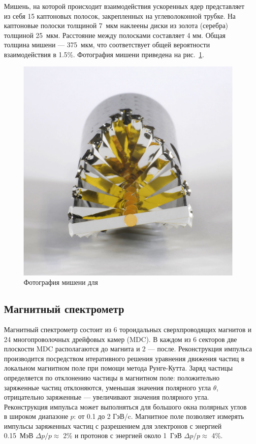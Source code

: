 Мишень, на которой происходит взаимодействия ускоренных ядер представляет из себя 15 каптоновых полосок, закрепленных на углеволоконной трубке.
На каптоновые полоски толщиной 7~мкм наклеены диски из золота (серебра) толщиной 25~мкм.
Расстояние между полосками составляет 4 мм. 
Общая толщина мишени --- 375~мкм, что соответствует общей вероятности взаимодействия в 1.5\%.
Фотография мишени приведена на рис.~\ref{fig:hades_target}. 
%
\begin{figure}[ht]
\begin{center}
\includegraphics[width=0.55\linewidth]{images/hades_target.jpg}
\caption{ Фотография мишени для  }
\label{fig:hades_target}
\end{center}
\end{figure}

\subsection{ Магнитный спектрометр }

Магнитный спектрометр состоит из 6 тороидальных сверхпроводящих магнитов и 24 многопроволочных дрейфовых камер (MDC).
В каждом из 6 секторов две плоскости MDC располагаются до магнита и 2 --- после. 
Реконструкция импульса производится посредством итеративного решения уравнения движения частиц в локальном магнитном поле при помощи метода Рунге-Кутта.
Заряд частицы определяется по отклонению частицы в магнитном поле: положительно заряженные частиц отклоняются, уменьшая значения полярного угла $\theta$, отрицательно заряженные --- увеличивают значения полярного угла.
Реконструкция импульса может выполняться для большого окна полярных углов в широком диапазоне $p$: от 0.1 до 2 ГэВ/c.
Магнитное поле позволяет измерять импульсы заряженных частиц с разрешением для электронов с энергией 0.15~МэВ $\Delta p/p \approx$ 2\% и протонов с энергией около 1~ГэВ $\Delta p/p \approx$ 4\%.  


